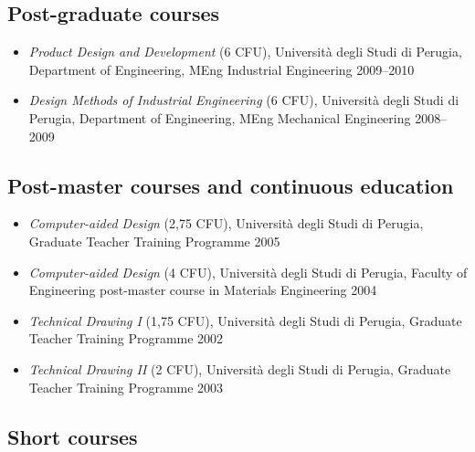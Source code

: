 \documentclass[11pt]{article}
\begin{document}
\subsection*{Post-graduate courses}

\begin{itemize}
	\item \emph{Product Design and Development} (6 CFU), Università degli Studi di Perugia, Department of Engineering, MEng Industrial Engineering \mbox{} \hfill 2009--2010
	\item \emph{Design Methods of Industrial Engineering} (6 CFU), Università degli Studi di Perugia, Department of Engineering, MEng Mechanical Engineering \mbox{} \hfill 2008--2009
\end{itemize}

\subsection*{Post-master courses and continuous education}

\begin{itemize}
	\item \emph{Computer-aided Design} (2,75 CFU), Università degli Studi di Perugia, Graduate Teacher Training Programme \mbox{} \hfill 2005
	\item \emph{Computer-aided Design} (4 CFU), Università degli Studi di Perugia, Faculty of Engineering post-master course in Materials Engineering \mbox{} \hfill 2004
  \item \emph{Technical Drawing I} (1,75 CFU), Università degli Studi di Perugia, Graduate Teacher Training Programme \mbox{} \hfill 2002
  \item \emph{Technical Drawing II} (2 CFU), Università degli Studi di Perugia, Graduate Teacher Training Programme \mbox{} \hfill 2003
\end{itemize}

\subsection*{Short courses}
\end{document}
